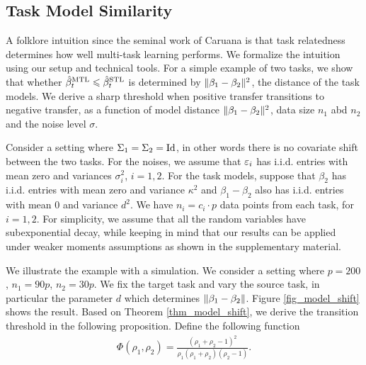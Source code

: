 \subsection{Task Model Similarity}\label{sec_similarity}

A folklore intuition since the seminal work of Caruana \cite{C97} is that task relatedness determines how well multi-task learning performs.
We formalize the intuition using our setup and technical tools.
For a simple example of two tasks, we show that whether $\hat{\beta}_t^{\text{MTL}} \leqslant \hat{\beta}_t^{\text{STL}}$ is determined by $\|\beta_1 - \beta_2\|^2$, the distance of the task models.
We derive a sharp threshold when positive transfer transitions to negative transfer, as a function of model distance $\|\beta_1 - \beta_2\|^2$, data size $n_1$ abd $n_2$ and the noise level $\sigma$.

\begin{example}\label{ex_basic}
	Consider a setting where $\Sigma_1 = \Sigma_2 = \operatorname{Id}$, in other words there is no covariate shift between the two tasks. For the noises, we assume that ${\varepsilon}_i$ has i.i.d. entries with mean zero and variances $\sigma_i^2$, $i=1,2$. 
	For the task models, suppose that $\beta_2$ has i.i.d. entries with mean zero and variance $\kappa^2$ and $\beta_1 - \beta_2$ also has i.i.d. entries with mean $0$ and variance $d^2$.
	We have $n_i = c_i \cdot p$ data points from each task, for $i = 1, 2$.
	For simplicity, we assume that all the random variables have subexponential decay, while keeping in mind that our results can be applied under weaker moments assumptions as shown in the supplementary material.
\end{example}

We illustrate the example with a simulation.
We consider a setting where $p = 200$, $n_1 = 90p$, $n_2 = 30p$.
We fix the target task and vary the source task, in particular the parameter $d$ which determines $\|\beta_1 - \beta_2\|$.
Figure \ref{fig_model_shift} shows the result.
Based on Theorem \ref{thm_model_shift}, we derive the transition threshold in the following proposition.
Define the following function
\begin{align*}
	\Phi(\rho_1, \rho_2) = \frac{(\rho_1 + \rho_2 - 1)^2}{\rho_1 (\rho_1 + \rho_2) (\rho_2 - 1)}.
\end{align*}

